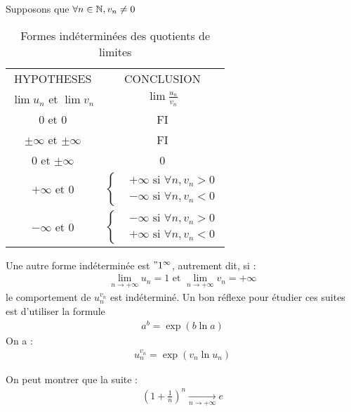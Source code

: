 \begin{remarque}
    Supposons que $\forall n \in \mathbb{N}, v_n \neq 0$
    \begin{table}[!h]
    \centering
    \begin{tabular}{c c}
        HYPOTHESES & CONCLUSION \\
        $\lim u_n$ et $\lim v_n$ & $\lim \frac{u_n}{v_n}$ \\
        $0$ et $0$ & FI \\
        $\pm \infty$ et $\pm \infty$ & FI \\
        $0$ et $\pm \infty$ & 0 \\
        $+\infty$ et $0$ & $\begin{cases} 
                             &+\infty \text{ si } \forall n, v_n > 0 \\
                             &-\infty \text{ si } \forall n, v_n < 0 
                            \end{cases}$ \\
        $-\infty$ et $0$ & $\begin{cases}
                                &-\infty \text{ si } \forall n, v_n > 0 \\
                                &+\infty \text{ si } \forall n, v_n < 0
                            \end{cases}$
    \end{tabular}
    \caption{Formes indéterminées des quotients de limites}
\end{table}
\end{remarque}

\begin{remarque}
    Une autre forme indéterminée est $"1^{\infty}$, autrement dit, si :
    \begin{align*}
        \lim_{n \to +\infty} u_n = 1 \text{ et } \lim_{n \to +\infty} v_n = +\infty
    \end{align*}
    le comportement de $u_n^{v_n}$ est indéterminé. Un bon réflexe pour étudier ces suites est d'utiliser la formule 
    \begin{align*}
        a^b = \exp(b\ln a)
    \end{align*}
    On a :
    \begin{align*}
        u_n^{v_n} = \exp(v_n \ln u_n)
    \end{align*}
\end{remarque}

\begin{exemple}
On peut montrer que la suite :
\begin{align*} 
    \left(1 + \frac{1}{n}\right)^n \xrightarrow[n \to +\infty]{} e
\end{align*}
\end{exemple}

